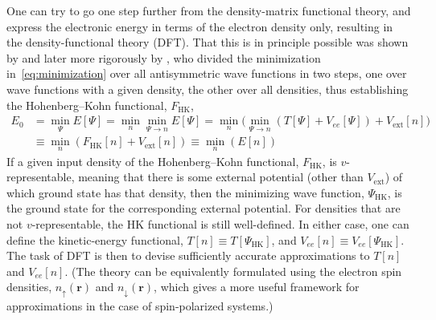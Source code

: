 One can try to go one step further from the density-matrix functional theory, and express the electronic energy in terms of the electron density only, resulting in the density-functional theory (DFT).
That this is in principle possible was shown by \citet{HohenbergPR64} and later more rigorously by \citet{LevyPNAS79}, who divided the minimization in~\eqref{eq:minimization} over all antisymmetric wave functions in two steps, one over wave functions with a given density, the other over all densities, thus establishing the Hohenberg--Kohn functional, $F_\text{HK}$,
\begin{equation}
\begin{aligned}
  E_0&=\min_\Psi E[\Psi]=\min_n\min_{\Psi\rightarrow n}E[\Psi]=\min_n\big(\min_{\Psi\rightarrow n}(T[\Psi]+V_{ee}[\Psi])+V_\text{ext}[n]\big) \\
  &\equiv\min_n(F_\text{HK}[n]+V_\text{ext}[n])\equiv\min_n(E[n])
\end{aligned}
\end{equation}
If a given input density of the Hohenberg--Kohn functional, $F_\text{HK}$, is $v$-representable, meaning that there is some external potential (other than $V_\text{ext}$) of which ground state has that density, then the minimizing wave function, $\Psi_\text{HK}$, is the ground state for the corresponding external potential.
For densities that are not $v$-representable, the HK functional is still well-defined.
In either case, one can define the kinetic-energy functional, $T[n]\equiv T[\Psi_\text{HK}]$, and $V_{ee}[n]\equiv V_{ee}[\Psi_\text{HK}]$.
The task of DFT is then to devise sufficiently accurate approximations to $T[n]$ and $V_{ee}[n]$.
(The theory can be equivalently formulated using the electron spin densities, $n_\uparrow(\mathbf r)$ and $n_\downarrow(\mathbf r)$, which gives a more useful framework for approximations in the case of spin-polarized systems.)

